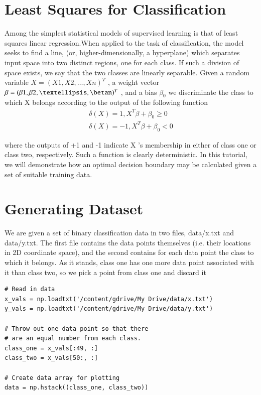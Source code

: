 \documentclass[journal,12pt,twocolumn]{IEEEtran}
\begin{document}
\section{Least Squares for Classification}
Among the simplest statistical models of supervised learning is that of least squares linear regression.When applied to the task of classification, the model seeks to find a line, (or, higher-dimensionally, a hyperplane) which separates input space into two distinct regions, one for each class. If such a division of space exists, we say that the two classes are linearly separable. Given a random variable  $X=(X1,X2,…,Xn)^T$ , a weight vector  $\beta=(\beta1,\beta2,…,\betan)^T$ , and a bias  $\beta_{0}$  we discriminate the class to which  X  belongs according to the output of the following function
\begin{align}
    \delta(X)= 1 , X^{T}\beta+\beta_{0} \geq 0
\\
    \delta(X)= -1 , X^{T}\beta+\beta_{0} < 0
\end{align}

 
where the outputs of +1 and -1 indicate  X 's membership in either of class one or class two, respectively. Such a function is clearly deterministic. In this tutorial, we will demonstrate how an optimal decision boundary may be calculated given a set of suitable training data.

\section{Generating Dataset}
We are given a set of binary classification data in two files, data/x.txt and data/y.txt. The first file contains the data points themselves (i.e. their locations in 2D coordinate space), and the second contains for each data point the class to which it belongs. As it stands, class one has one more data point associated with it than class two, so we pick a point from class one and discard it
\begin{lstlisting}
# Read in data
x_vals = np.loadtxt('/content/gdrive/My Drive/data/x.txt')
y_vals = np.loadtxt('/content/gdrive/My Drive/data/y.txt')

# Throw out one data point so that there
# are an equal number from each class.
class_one = x_vals[:49, :]
class_two = x_vals[50:, :]

# Create data array for plotting
data = np.hstack((class_one, class_two))
\end{lstlisting}
\end{document}
